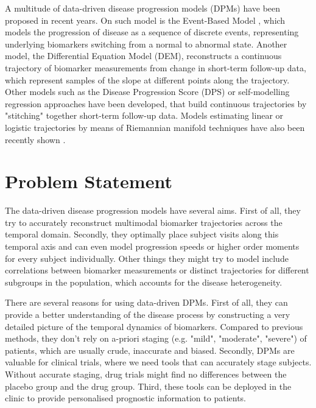 A multitude of data-driven disease progression models (DPMs) have been proposed in recent years. On such model is the Event-Based Model \cite{fonteijn2012event}, which models the progression of disease as a sequence of discrete events, representing underlying biomarkers switching from a normal to abnormal state. Another model, the Differential Equation Model (DEM), reconstructs a continuous trajectory of biomarker measurements from change in short-term follow-up data, which represent samples of the slope at different points along the trajectory. Other models such as the Disease Progression Score (DPS) \cite{jedynak2012} or self-modelling regression approaches \cite{donohue2014estimating} have been developed, that build continuous trajectories by "stitching" together short-term follow-up data. Models estimating linear or logistic trajectories by means of Riemannian manifold techniques have also been recently shown \cite{schiratti2015mixed}.

\section{Problem Statement}

The data-driven disease progression models have several aims. First of all, they try to accurately reconstruct multimodal biomarker trajectories across the temporal domain. Secondly, they optimally place subject visits along this temporal axis and can even model progression speeds or higher order moments for every subject individually. Other things they might try to model include correlations between biomarker measurements or distinct trajectories for different subgroups in the population, which accounts for the disease heterogeneity. 

There are several reasons for using data-driven DPMs. First of all, they can provide a better understanding of the disease process by constructing a very detailed picture of the temporal dynamics of biomarkers. Compared to previous methods, they don't rely on a-priori staging (e.g. "mild", "moderate", "severe") of patients, which are usually crude, inaccurate and biased. Secondly, DPMs are valuable for clinical trials, where we need tools that can accurately stage subjects. Without accurate staging, drug trials might find no differences between the placebo group and the drug group. Third, these tools can be deployed in the clinic to provide personalised prognostic information to patients. 

